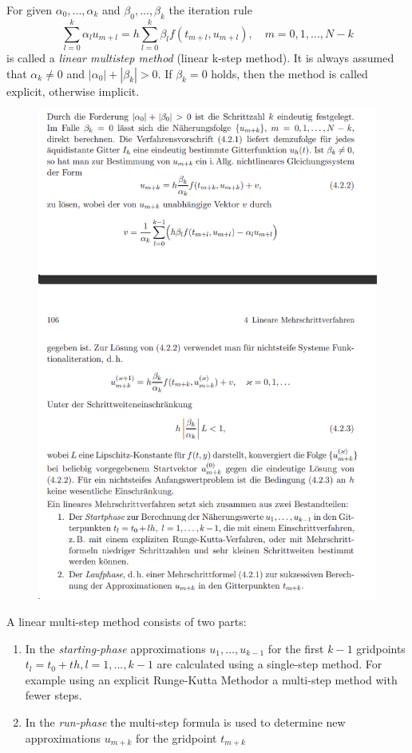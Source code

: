 	\begin{definition}
		For given $\alpha_0, ..., \alpha_k$ and $\beta_0, ..., \beta_k$ the iteration rule
		\begin{equation}
			\label{linear-multistep-method}
			\sum_{l=0}^{k} \alpha_l u_{m+l} = h \sum_{l=0}^{k} \beta_l f(t_{m+l}, u_{m+l}), \quad m=0,1,...,N-k
		\end{equation}
		is called a \emph{linear multistep method} (linear k-step method). It is always assumed that $\alpha_k \neq 0$ and $|\alpha_0| + |\beta_k| > 0$. If $\beta_k=0$ holds, then the method is called explicit, otherwise implicit.
	\end{definition}
	
	\begin{figure}[H]
		\centering
		\includegraphics[width=0.7\linewidth]{screenshot010}
		\caption{}
		\label{fig:screenshot010}
	\end{figure}
	
	A linear multi-step method consists of two parts:
	\begin{enumerate}
		\item In the \emph{starting-phase} approximations $u_1,...,u_{k-1}$ for the first $k-1$ gridpoints $t_l = t_0+th, l=1,...,k-1$ are calculated using a single-step method. For example using an explicit Runge-Kutta Methodor a multi-step method with fewer steps.
		
		\item  In the \emph{run-phase} the multi-step formula is used to determine new approximations $u_{m+k}$ for the gridpoint $t_{m+k}$
	\end{enumerate}
	
